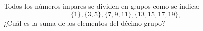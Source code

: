 Todos los números impares se dividen en grupos como se indica:
\[\{1\},\{3,5\},\{7,9,11\},\{13,15,17,19\},\dots\]
¿Cuál es la suma de los elementos del décimo grupo?
